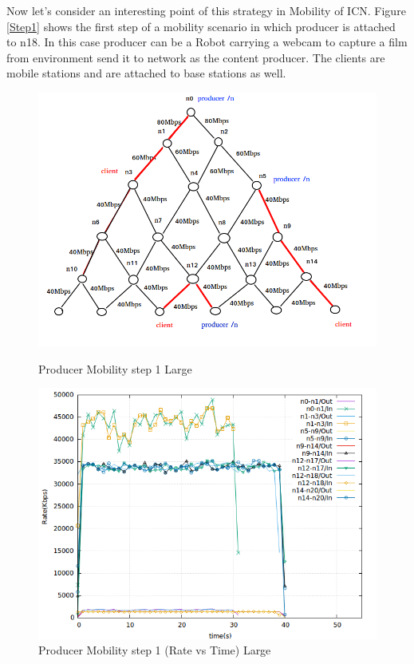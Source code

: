Now let's consider an interesting point of this strategy in Mobility of ICN. Figure \ref{Step1} shows the first step of a mobility scenario in which producer is attached to n18. In this case producer can be a Robot carrying a webcam to capture a film from environment send it to network as the content producer. The clients are mobile stations and are attached to base stations as well.   


\begin{figure}[H]

\begin{center}


\includegraphics[scale = 0.4]{Figures/Step1.png}

\caption{Producer Mobility step 1 Large} \label{Step1} 

\includegraphics[scale = 0.4]{Figures/step1.png}

\caption{Producer Mobility step 1 (Rate vs Time) Large} \label{step1} 


\end{center}

\end{figure}






